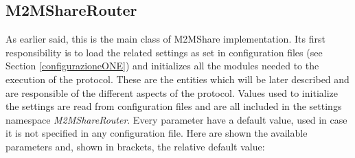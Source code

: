 \subsection{M2MShareRouter}
As earlier said, this is the main class of M2MShare implementation. Its first responsibility is to load the related settings as set in configuration files (see Section \ref{configurazioneONE}) and initializes all the modules needed to the execution of the protocol. These are the entities which will be later described and are responsible of the different aspects of the protocol. Values used to initialize the settings are read from configuration files and are all included in the settings namespace \textit{M2MShareRouter}. Every parameter have a default value, used in case it is not specified in any configuration file. Here are shown the available parameters and, shown in brackets, the relative default value:
